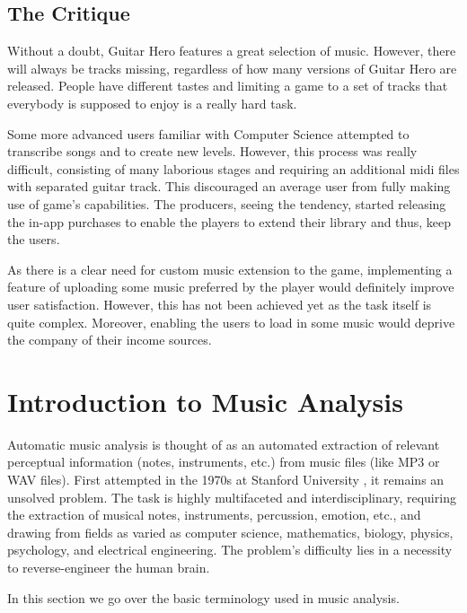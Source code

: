 \vspace{10pt}


\subsection{The Critique}

Without a doubt, Guitar Hero features a great selection of music. However, there will always be tracks missing, regardless of how many versions of Guitar Hero are released. People have different tastes and limiting a game to a set of tracks that everybody is supposed to enjoy is a really hard task. 

Some more advanced users familiar with Computer Science attempted to transcribe songs and to create new levels. However, this process was really difficult, consisting of many laborious stages and requiring an additional midi files with separated guitar track. This discouraged an average user from fully making use of game’s capabilities. The producers, seeing the tendency, started releasing the in-app purchases to enable the players to extend their library and thus, keep the users. 

As there is a clear need for custom music extension to the game, implementing a feature of uploading some music preferred by the player would definitely improve user satisfaction. However, this has not been achieved yet as the task itself is quite complex. Moreover, enabling the users to load in some music would deprive the company of their income sources.

\vspace{30pt}

\section{Introduction to Music Analysis}

Automatic music analysis is thought of as an automated extraction of relevant perceptual information (notes, instruments, etc.) from music files (like MP3 or WAV files). First attempted in the 1970s at Stanford University \cite{Moore}, it remains an unsolved problem. The task is highly multifaceted and interdisciplinary, requiring the extraction of musical notes, instruments, percussion, emotion, etc., and drawing from fields as varied as computer science, mathematics, biology, physics, psychology, and electrical engineering. The problem's difficulty lies in a necessity to reverse-engineer the human brain. 

In this section we go over the basic terminology used in music analysis.

